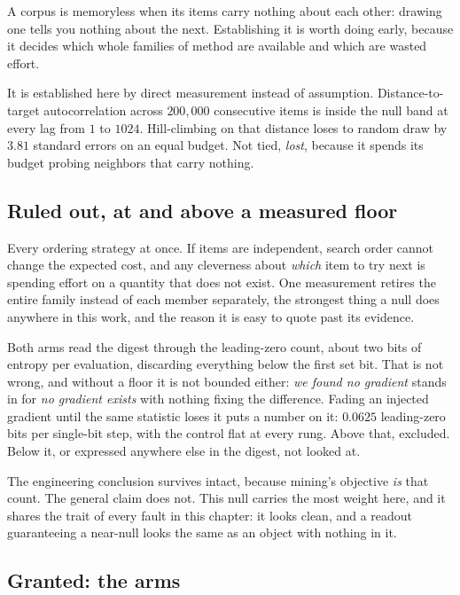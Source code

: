 A corpus is memoryless when its items carry nothing about each other: drawing one tells you nothing about the next. Establishing it is worth doing early, because it decides which whole families of method are available and which are wasted effort.

It is established here by direct measurement instead of assumption. Distance-to-target autocorrelation across \(200{,}000\) consecutive items is inside the null band at every lag from \(1\) to \(1024\). Hill-climbing on that distance loses to random draw by \(3.81\) standard errors on an equal budget. Not tied, \emph{lost}, because it spends its budget probing neighbors that carry nothing.

\subsection{Ruled out, at and above a measured floor}

Every ordering strategy at once. If items are independent, search order cannot change the expected cost, and any cleverness about \emph{which} item to try next is spending effort on a quantity that does not exist. One measurement retires the entire family instead of each member separately, the strongest thing a null does anywhere in this work, and the reason it is easy to quote past its evidence.

Both arms read the digest through the leading-zero count, about two bits of entropy per evaluation, discarding everything below the first set bit. That is not wrong, and without a floor it is not bounded either: \emph{we found no gradient} stands in for \emph{no gradient exists} with nothing fixing the difference. Fading an injected gradient until the same statistic loses it puts a number on it: \(0.0625\) leading-zero bits per single-bit step, with the control flat at every rung. Above that, excluded. Below it, or expressed anywhere else in the digest, not looked at.

The engineering conclusion survives intact, because mining's objective \emph{is} that count. The general claim does not. This null carries the most weight here, and it shares the trait of every fault in this chapter: it looks clean, and a readout guaranteeing a near-null looks the same as an object with nothing in it.

\subsection{Granted: the arms}

